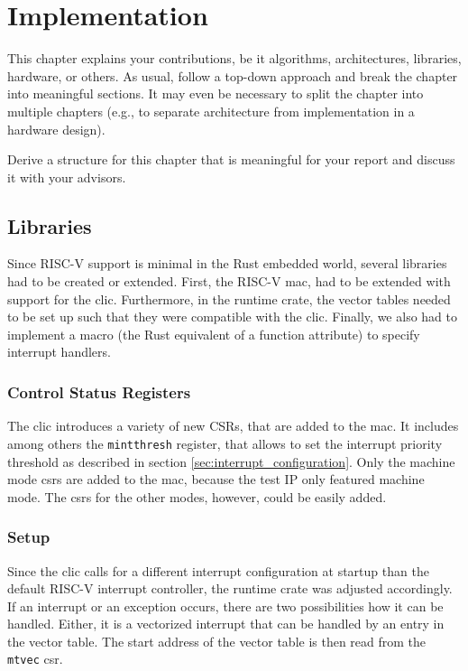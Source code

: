 \chapter{Implementation}
\label{ch:implementation}

This chapter explains your contributions, be it algorithms, architectures, libraries, hardware, or others.
As usual, follow a top-down approach and break the chapter into meaningful sections.
It may even be necessary to split the chapter into multiple chapters (e.g., to separate architecture from implementation in a hardware design).

Derive a structure for this chapter that is meaningful for your report and discuss it with your advisors.

\section{Libraries}
\label{sec:libraries}
Since RISC-V support is minimal in the Rust embedded world, several libraries had to be created or extended.
First, the RISC-V \gls{mac}, had to be extended with support for the \gls{clic}. Furthermore, in the runtime crate, the vector tables needed to be set up such that they were compatible with the \gls{clic}. 
Finally, we also had to implement a macro (the Rust equivalent of a function attribute) to specify interrupt handlers.

\subsection{Control Status Registers}
The \gls{clic} introduces a variety of new CSRs, that are added to the \gls{mac}. It includes among others the \texttt{mintthresh} register, that allows to set the interrupt priority threshold as described in section \ref{sec:interrupt_configuration}. Only the machine mode \gls{csr}s are added to the \gls{mac}, because the test IP only featured machine mode. The \gls{csr}s for the other modes, however, could be easily added.

\subsection{Setup}
Since the \gls{clic} calls for a different interrupt configuration at startup than the default RISC-V interrupt controller, the runtime crate was adjusted accordingly.
If an interrupt or an exception occurs, there are two possibilities how it can be handled.
Either, it is a vectorized interrupt that can be handled by an entry in the vector table. The start address of the vector table is then read from the \texttt{mtvec} \gls{csr}. 

